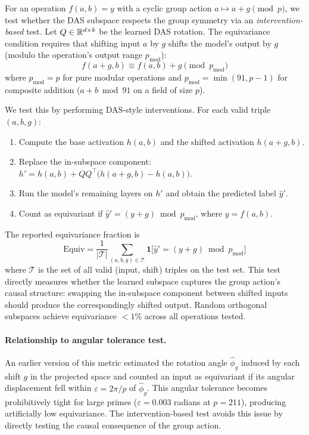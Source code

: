 For an operation $f(a,b) = y$ with a cyclic group action
$a \mapsto a + g \pmod{p}$, we test whether the DAS subspace respects
the group symmetry via an \emph{intervention-based} test. Let
$Q \in \mathbb{R}^{d \times k}$ be the learned DAS rotation. The equivariance
condition requires that shifting input $a$ by $g$ shifts the model's
output by $g$ (modulo the operation's output range $p_\text{mod}$):
\begin{equation}
f(a + g, b) \equiv f(a, b) + g \pmod{p_\text{mod}}
\label{eq:equiv_condition}
\end{equation}
where $p_\text{mod} = p$ for pure modular operations and
$p_\text{mod} = \min(91, p{-}1)$ for composite addition
($a + b \bmod 91$ on a field of size $p$).

We test this by performing DAS-style interventions. For each valid
triple $(a, b, g)$:
\begin{enumerate}[leftmargin=*]
\item Compute the base activation $h(a, b)$ and the shifted activation
  $h(a{+}g, b)$.
\item Replace the in-subspace component: $h' = h(a,b) + Q Q^\top
  \bigl(h(a{+}g, b) - h(a, b)\bigr)$.
\item Run the model's remaining layers on $h'$ and obtain the predicted
  label $\hat{y}'$.
\item Count as equivariant if $\hat{y}' = (y + g) \bmod p_\text{mod}$,
  where $y = f(a, b)$.
\end{enumerate}
The reported equivariance fraction is
\begin{equation}
\text{Equiv} = \frac{1}{|\mathcal{T}|} \sum_{(a,b,g) \in \mathcal{T}}
\mathbf{1}\bigl[\hat{y}' = (y + g) \bmod p_\text{mod}\bigr]
\label{eq:equiv_fraction}
\end{equation}
where $\mathcal{T}$ is the set of all valid (input, shift) triples on the
test set. This test directly measures whether the learned subspace
captures the group action's causal structure: swapping the
in-subspace component between shifted inputs should produce the
correspondingly shifted output. Random orthogonal subspaces achieve
equivariance $< 1\%$ across all operations tested.

\paragraph{Relationship to angular tolerance test.}
An earlier version of this metric estimated the rotation angle
$\hat\phi_g$ induced by each shift $g$ in the projected space and
counted an input as equivariant if its angular displacement fell
within $\varepsilon = 2\pi/p$ of $\hat\phi_g$. This angular tolerance
becomes prohibitively tight for large primes ($\varepsilon = 0.003$
radians at $p = 211$), producing artificially low equivariance.
The intervention-based test avoids this issue by directly testing the
causal consequence of the group action.

